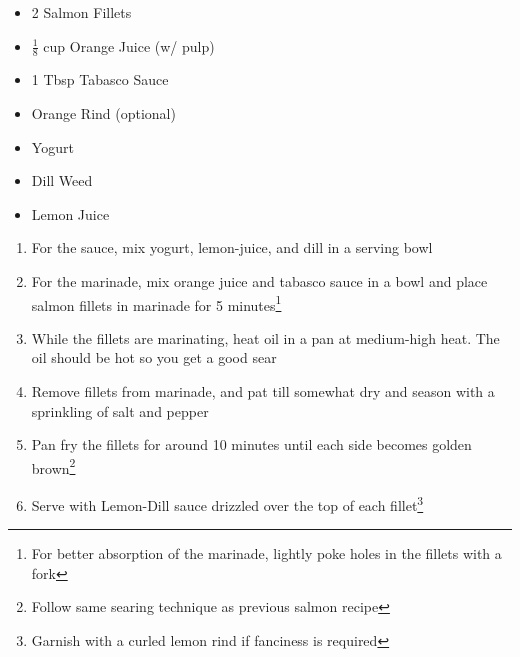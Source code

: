 \documentclass[oneside]{recipe}
\newcommand{\recipecolumn}[2]{
	\begin{multicols}{2}
	\raggedcolumns
	#1
	\columnbreak
	#2
	\end{multicols}
}
\begin{document}
\recipecolumn{
	\begin{itemize}
		\item 2 Salmon Fillets
		\item $\frac{1}{8}$ cup Orange Juice (w/ pulp)
		\item 1 Tbsp Tabasco Sauce
		\item Orange Rind (optional)
		\item Yogurt
		\item Dill Weed
		\item Lemon Juice
	\end{itemize}
}{
	\begin{enumerate}
		\item For the sauce, mix yogurt, lemon-juice, and dill in a serving bowl
		\item For the marinade, mix orange juice and tabasco sauce in a bowl and place salmon fillets in marinade for 5 minutes\footnote{For better absorption of the marinade, lightly poke holes in the fillets with a fork}
		\item While the fillets are marinating, heat oil in a pan at medium-high heat. The oil should be hot so you get a good sear
		\item Remove fillets from marinade, and pat till somewhat dry and season with a sprinkling of salt and pepper
		\item Pan fry the fillets for around 10 minutes until each side becomes golden brown\footnote{Follow same searing technique as previous salmon recipe}
		\item Serve with Lemon-Dill sauce drizzled over the top of each fillet\footnote{Garnish with a curled lemon rind if fanciness is required}
	\end{enumerate}
}
\end{document}
